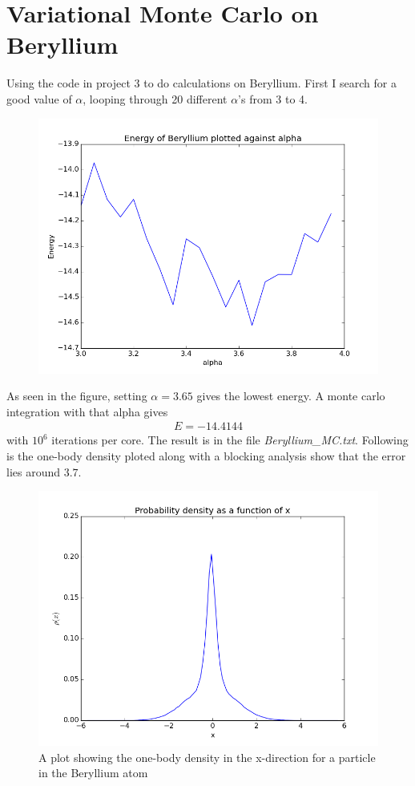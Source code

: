 \documentclass[a4paper, 12pt, titlepage]{article}
\begin{document}
\section*{Variational Monte Carlo on Beryllium}
 Using the code in project 3 to do calculations on Beryllium. First I search for a good value of $\alpha$, looping through 20 different $\alpha$'s from 3 to 4.
 \begin{figure}
 	\centering
 	\includegraphics[width=\textwidth]{../python_programs/FindOptimalAlphaBeryllium.png}
 \end{figure}
 As seen in the figure, setting $\alpha = 3.65$ gives the lowest energy. A monte carlo integration with that alpha gives 
 \begin{align*}
 	E = -14.4144
 \end{align*}
 with $10^6$ iterations per core. The result is in the file \textit{Beryllium\_MC.txt}. Following is the one-body density ploted along with a blocking analysis show that the error lies around $3.7$. 
 \begin{figure}
 	\centering
 	\includegraphics[width=\textwidth]{../python_programs/ProbabilityDensityBeryllium.png}
 	\caption{A plot showing the one-body density in the x-direction for a particle in the Beryllium atom}
 \end{figure}
\end{document}
